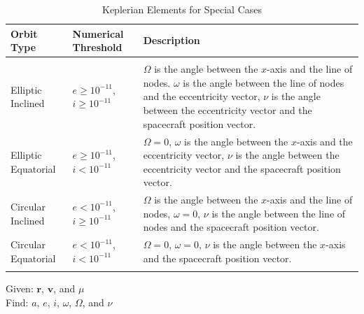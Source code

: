 %
\begin{table} \caption{Keplerian Elements for Special Cases}
 \centering {}
 \label{Table:ElementSpecialCases}
\begin{tabular}{p{1.25 in} p{1.35 in} p{3.2 in}  }
  \hline\hline
   Orbit Type & Numerical Threshold & Description \\
  \hline \\
  Elliptic Inclined & $e \geq 10^{-11}$, $i \geq 10^{-11}$ & $\Omega$ is the angle between the $x$-axis and the line of nodes. $\omega$ is the angle between the line of nodes and the eccentricity vector, $\nu$ is
                                                     the angle between the eccentricity vector and the spacecraft position vector.\\
  Elliptic Equatorial & $e \geq 10^{-11}$, $i < 10^{-11}$ & $\Omega = 0$, $\omega$ is the angle between the $x$-axis and the eccentricity vector, $\nu$ is
                                                     the angle between the eccentricity vector and the spacecraft position vector.\\
  Circular Inclined & $e < 10^{-11}$, $i \geq 10^{-11}$  & $\Omega$ is the angle between the $x$-axis and the line of nodes, $\omega = 0$, $\nu$ is
                                                     the angle between the line of nodes and the spacecraft position vector.\\
  Circular Equatorial & $e < 10^{-11}$, $i < 10^{-11}$ & $\Omega = 0$, $\omega = 0$, $\nu$ is the angle between the $x$-axis and the spacecraft position vector. \\
  \hline\hline \label{Table:KeplerianElementsSpecialCases}
\end{tabular}
\end{table}

\noindent Given:  $\mathbf{r}$, $\mathbf{v}$, and $\mu$\\

\noindent Find: $a$, $e$, $i$, $\omega$, $\Omega$, and $\nu$

